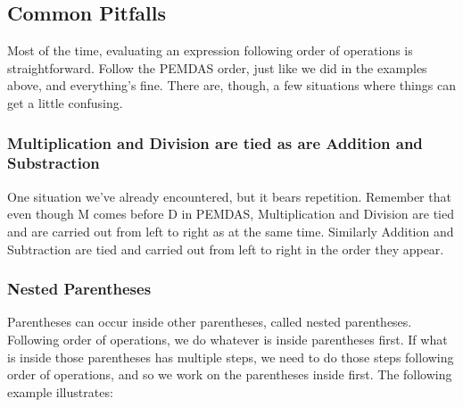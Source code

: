 %
%

\subsection{Common Pitfalls}

Most of the time, evaluating an expression following order of operations is straightforward. Follow the PEMDAS order, just like we did in the examples above, and everything’s fine. There are, though, a few situations where things can get a little confusing.

\subsubsection*{Multiplication and Division are tied as are Addition and Substraction}

One situation we’ve already encountered, but it bears repetition. Remember that even though M comes before D in PEMDAS, Multiplication and Division are tied and are carried out from left to right as at the same time.  Similarly Addition and Subtraction are tied and carried out from left to right in the order they appear.



\subsubsection*{Nested Parentheses}

Parentheses can occur inside other parentheses, called nested parentheses. Following order of operations, we do whatever is inside parentheses first. If what is inside those parentheses has multiple steps, we need to do those steps following order of operations, and so we work on the parentheses inside first. The following example illustrates:


